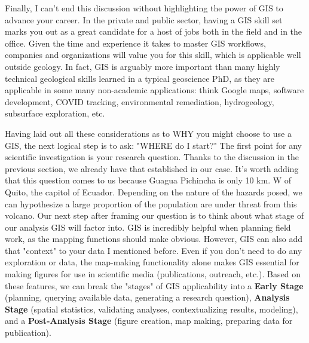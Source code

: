 \documentclass{article}
\begin{document}
Finally, I can't end this discussion without highlighting the power of GIS to advance your career. In the private and public sector, having a GIS skill set marks you out as a great candidate for a host of jobs both in the field and in the office. Given the time and experience it takes to master GIS workflows, companies and organizations will value you for this skill, which is applicable well outside geology. In fact, GIS is arguably more important than many highly technical geological skills learned in a typical geoscience PhD, as they are applicable in some many non-academic applications: think Google maps, software development, COVID tracking, environmental remediation, hydrogeology, subsurface exploration, etc. 

Having laid out all these considerations as to WHY you might choose to use a GIS, the next logical step is to ask: "WHERE do I start?" The first point for any scientific investigation is your research question. Thanks to the discussion in the previous section, we already have that established in our case. It's worth adding that this question comes to us because Guagua Pichincha is only 10 km. W of Quito, the capitol of Ecuador. Depending on the nature of the hazards posed, we can hypothesize a large proportion of the population are under threat from this volcano. Our next step after framing our question is to think about what stage of our analysis GIS will factor into. GIS is incredibly helpful when planning field work, as the mapping functions should make obvious. However, GIS can also add that "context" to your data I mentioned before. Even if you don't need to do any exploration or data, the map-making functionality alone makes GIS essential for making figures for use in scientific media (publications, outreach, etc.). Based on these features, we can break the "stages" of GIS applicability into a \textbf{Early Stage} (planning, querying available data, generating a research question), \textbf{Analysis Stage} (spatial statistics, validating analyses, contextualizing results, modeling), and a \textbf{Post-Analysis Stage} (figure creation, map making, preparing data for publication).  
\end{document}
